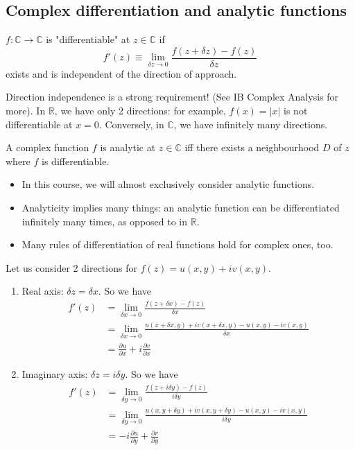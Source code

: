 \documentclass[a4paper]{scrartcl}
\begin{document}
\subsection{Complex differentiation and analytic functions}
\begin{definition}
      $f: \mathbb{C} \rightarrow \mathbb{C}$ is "differentiable" at $z \in \mathbb{C}$ if \[
      f' (z) \equiv \lim_{\delta z \rightarrow 0} \frac{f (z+ \delta z)-f (z)}{\delta z}
      \] exists and is independent of the direction of approach.
\end{definition}
\begin{remark}
      Direction independence is a strong requirement! (See IB Complex Analysis for more). In $\mathbb{R}$, we have only 2 directions: for example, $f (x)=|x|$ is not differentiable at $x=0$. Conversely, in $\mathbb{C}$, we have infinitely many directions. 
\end{remark}
\begin{definition}[Analyticity]
      A complex function $f$ is analytic at $z \in \mathbb{C}$ iff there exists a neighbourhood $D$ of $z$ where $f$ is differentiable.
\end{definition}
\begin{remark}
      \begin{itemize}
           \item In this course, we will almost exclusively consider analytic functions.
           \item Analyticity implies many things: an analytic function can be differentiated infinitely many times, as opposed to in $\mathbb{R}$.
           \item Many rules of differentiation of real functions hold for complex ones, too. 
      \end{itemize}
\end{remark}
Let us consider 2 directions for $f (z)=u (x,y)+iv (x,y)$. 
\begin{enumerate}
     \item Real axis: $\delta z= \delta x$. So we have 
     \begin{align*}
          f' (z)&= \lim_{\delta x \rightarrow 0} \frac{f (z+\delta x)-f (z)}{\delta x}\\
          &=\lim_{\delta x \rightarrow 0} \frac{u (x+\delta x,y)+iv (x+\delta x,y)-u (x,y)-iv (x,y)}{\delta x}\\
          &=\frac{\partial u}{\partial x}+i \frac{\partial v}{\partial x}
     \end{align*}
     \item Imaginary axis: $\delta z= i \delta y$. So we have 
     \begin{align*}
          f' (z)&= \lim_{\delta y \rightarrow 0} \frac{f (z+i\delta y)-f (z)}{i \delta y}\\
          &=\lim_{\delta y \rightarrow 0} \frac{u (x,y+\delta y)+iv (x,y+ \delta y)-u (x,y)-iv (x,y)}{i \delta y}\\
          &=-i\frac{\partial u}{\partial y}+\frac{\partial v}{\partial y}
     \end{align*}
\end{enumerate}
\end{document}
